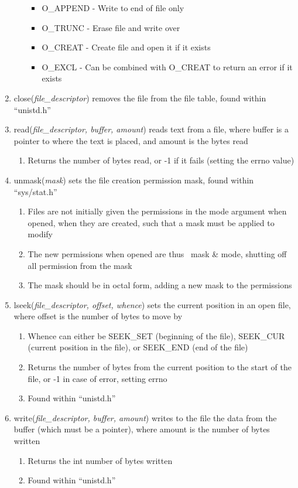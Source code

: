 \documentclass[11 pt, twoside]{article}
\begin{document}
\begin{enumerate}
\begin{enumerate}
\begin{itemize}
\item O\_APPEND - Write to end of file only
\item O\_TRUNC - Erase file and write over
\item O\_CREAT - Create file and open it if it exists
\item O\_EXCL - Can be combined with O\_CREAT to return an error if it exists
\end{itemize}
\end{enumerate}
\item close(\textit{file\_descriptor}) removes the file from the file table, found within ``unistd.h''
\item read(\textit{file\_descriptor, buffer, amount}) reads text from a file, where buffer is a pointer to where the text is placed, and amount is the bytes read
\begin{enumerate}
\item Returns the number of bytes read, or -1 if it fails (setting the errno value)
\end{enumerate}
\item unmask(\textit{mask}) sets the file creation permission mask, found within ``sys/stat.h''
\begin{enumerate}
\item Files are not initially given the permissions in the mode argument when opened, when they are created, such that a mask must be applied to modify
\item The new permissions when opened are thus ~mask \& mode, shutting off all permission from the mask
\item The mask should be in octal form, adding a new mask to the permissions
\end{enumerate}
\item lseek(\textit{file\_descriptor, offset, whence}) sets the current position in an open file, where offset is the number of bytes to move by
\begin{enumerate}
\item Whence can either be SEEK\_SET (beginning of the file), SEEK\_CUR (current position in the file), or SEEK\_END (end of the file)
\item Returns the number of bytes from the current position to the start of the file, or -1 in case of error, setting errno
\item Found within ``unistd.h''
\end{enumerate}
\item write(\textit{file\_descriptor, buffer, amount}) writes to the file the data from the buffer (which must be a pointer), where amount is the number of bytes written
\begin{enumerate}
\item Returns the int number of bytes written
\item Found within ``unistd.h''
\end{enumerate}
\end{enumerate}
\end{document}
